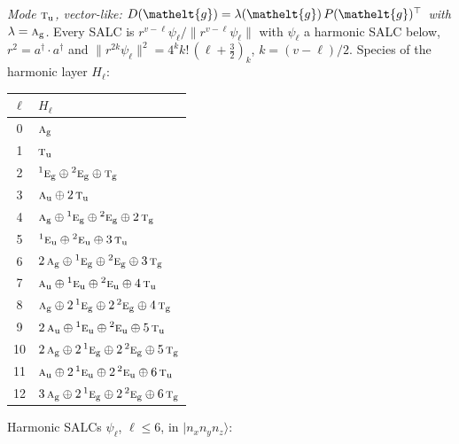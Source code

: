 \documentclass[11pt]{article}
\newcommand{\eltfont}[1]{{\let\sigma\eltsigma\mathelt{#1}}}
\newcommand{\irr}[1]{\text{\normalfont\scshape #1}}
\newcommand{\conjpair}[1]{{}^{#1}}
\newcommand{\elt}[1]{\eltfont{#1}}
\newcommand{\ptag}[1]{\mathrm{#1}}
\newcommand{\occ}[1]{\lvert #1\rangle}
\newcommand{\gel}{\elt{g}}             %
\newcommand{\gmat}{P(\gel)^{\top}}     %
\begin{document}
\emph{Mode $\irr{t}_{\ptag{u}}$, vector-like: $D(\gel)=\lambda(\gel)\,\gmat$ with $\lambda=\irr{a}_{\ptag{g}}$.} Every SALC is $r^{v-\ell}\psi_\ell/\lVert r^{v-\ell}\psi_\ell\rVert$ with $\psi_\ell$ a harmonic SALC below, $r^2=a^\dagger\!\cdot a^\dagger$ and $\lVert r^{2k}\psi_\ell\rVert^2=4^kk!\,(\ell+\tfrac32)_k$, $k=(v-\ell)/2$. Species of the harmonic layer $H_\ell$:
\begin{longtable}{c l}\hline $\ell$ & $H_\ell$\\ \hline\endhead
0 & $\irr{a}_{\ptag{g}}$\\
1 & $\irr{t}_{\ptag{u}}$\\
2 & $\conjpair{1}\irr{e}_{\ptag{g}}\oplus \conjpair{2}\irr{e}_{\ptag{g}}\oplus \irr{t}_{\ptag{g}}$\\
3 & $\irr{a}_{\ptag{u}}\oplus 2\,\irr{t}_{\ptag{u}}$\\
4 & $\irr{a}_{\ptag{g}}\oplus \conjpair{1}\irr{e}_{\ptag{g}}\oplus \conjpair{2}\irr{e}_{\ptag{g}}\oplus 2\,\irr{t}_{\ptag{g}}$\\
5 & $\conjpair{1}\irr{e}_{\ptag{u}}\oplus \conjpair{2}\irr{e}_{\ptag{u}}\oplus 3\,\irr{t}_{\ptag{u}}$\\
6 & $2\,\irr{a}_{\ptag{g}}\oplus \conjpair{1}\irr{e}_{\ptag{g}}\oplus \conjpair{2}\irr{e}_{\ptag{g}}\oplus 3\,\irr{t}_{\ptag{g}}$\\
7 & $\irr{a}_{\ptag{u}}\oplus \conjpair{1}\irr{e}_{\ptag{u}}\oplus \conjpair{2}\irr{e}_{\ptag{u}}\oplus 4\,\irr{t}_{\ptag{u}}$\\
8 & $\irr{a}_{\ptag{g}}\oplus 2\,\conjpair{1}\irr{e}_{\ptag{g}}\oplus 2\,\conjpair{2}\irr{e}_{\ptag{g}}\oplus 4\,\irr{t}_{\ptag{g}}$\\
9 & $2\,\irr{a}_{\ptag{u}}\oplus \conjpair{1}\irr{e}_{\ptag{u}}\oplus \conjpair{2}\irr{e}_{\ptag{u}}\oplus 5\,\irr{t}_{\ptag{u}}$\\
10 & $2\,\irr{a}_{\ptag{g}}\oplus 2\,\conjpair{1}\irr{e}_{\ptag{g}}\oplus 2\,\conjpair{2}\irr{e}_{\ptag{g}}\oplus 5\,\irr{t}_{\ptag{g}}$\\
11 & $\irr{a}_{\ptag{u}}\oplus 2\,\conjpair{1}\irr{e}_{\ptag{u}}\oplus 2\,\conjpair{2}\irr{e}_{\ptag{u}}\oplus 6\,\irr{t}_{\ptag{u}}$\\
12 & $3\,\irr{a}_{\ptag{g}}\oplus 2\,\conjpair{1}\irr{e}_{\ptag{g}}\oplus 2\,\conjpair{2}\irr{e}_{\ptag{g}}\oplus 6\,\irr{t}_{\ptag{g}}$\\
\hline\end{longtable}
Harmonic SALCs $\psi_\ell$, $\ell\le6$, in $\occ{n_xn_yn_z}$:
\end{document}
